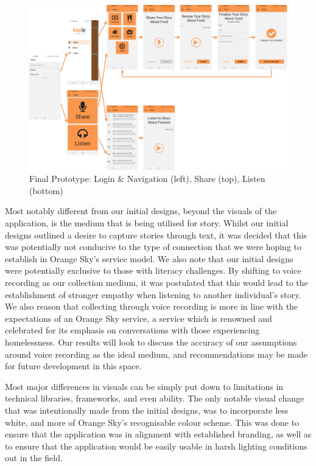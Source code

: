 \begin{figure}[ht!]
    \centering
    \includegraphics[width=\textwidth]{assets/designs/20200831-mockups.png}
    \caption{Final Prototype: Login \& Navigation (left), Share (top), Listen (bottom)}
    \label{finalprototype}
\end{figure}

Most notably different from our initial designs, beyond the visuals of the application, is the medium that is being utilised for story. Whilst our initial designs outlined a desire to capture stories through text, it was decided that this was potentially not conducive to the type of connection that we were hoping to establish in Orange Sky's service model. We also note that our initial designs were potentially exclusive to those with literacy challenges. By shifting to voice recording as our collection medium, it was postulated that this would lead to the establishment of stronger empathy when listening to another individual's story. We also reason that collecting through voice recording is more in line with the expectations of an Orange Sky service, a service which is renowned and celebrated for its emphasis on conversations with those experiencing homelessness. Our results will look to discuss the accuracy of our assumptions around voice recording as the ideal medium, and recommendations may be made for future development in this space.

Most major differences in visuals can be simply put down to limitations in technical libraries, frameworks, and even ability. The only notable visual change that was intentionally made from the initial designs, was to incorporate less white, and more of Orange Sky's recognisable colour scheme. This was done to ensure that the application was in alignment with established branding, as well as to ensure that the application would be easily usable in harsh lighting conditions out in the field.

